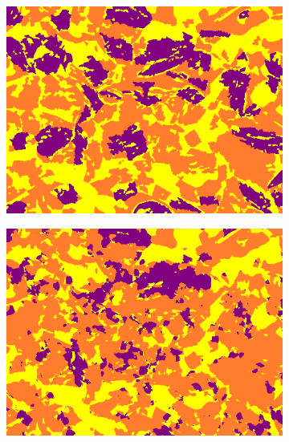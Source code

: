 \documentclass[]{article}
\begin{document}
\begin{figure}[!h]
\begin{subfigure}[b]{0.3\textwidth}
		\includegraphics[width=\textwidth]{images/inference/H2-type-L.png}
		\caption{}
		\label{fig:H2-type-label}
	\end{subfigure}
	\hfill
	\begin{subfigure}[b]{0.3\textwidth}
		\centering
		\includegraphics[width=\textwidth]{images/inference/H2-type-P.png}
		\caption{}
		\label{fig:H2-type-pred}
	\end{subfigure}
	\begin{subfigure}[b]{0.3\textwidth}
		\centering

\end{subfigure}
\end{figure}
\end{document}
